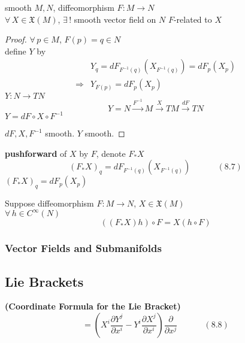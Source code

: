 \begin{proposition}[8.19]
  smooth $M,N$, diffeomorphism $F:M \to N$ \\
$\forall \, X \in \mathfrak{X}(M)$, $\exists \, !$ smooth vector field on $N$ $F$-related to $X$
\end{proposition}

\begin{proof}
$\forall \, p \in M$, $F(p) = q\in N$  \\

define $Y$ by 
\[
\begin{aligned}
  & Y_q = dF_{F^{-1}(q)}(X_{F^{-1}(q)} ) = dF_p(X_p) \\ 
  \Longrightarrow & Y_{F(p)} = dF_p(X_p) 
\end{aligned}
\]
$Y: N \to TN$ 
\[
Y = N \xrightarrow{F^{-1}} M \xrightarrow{X} TM \xrightarrow{dF} TN
\]
$Y = dF \circ X \circ F^{-1}$

$dF, X, F^{-1}$ smooth.  $Y$ smooth. 
\end{proof}
\textbf{pushforward} of $X$ by $F$, denote $F_*X$ 
\begin{equation}
  (F_*X)_q = dF_{F^{-1}(q)}(X_{F^{-1}(q) } ) \quad \quad \quad \, (8.7)
\end{equation}
$(F_*X)_q = dF_p(X_p)$



\begin{corollary}[8.21]
  Suppose diffeomorphism $F: M \to N$, $X \in \mathfrak{X}(M)$ \\
  $\forall \, h \in C^{\infty}(N)$
\[
((F_*X)h) \circ F = X(h\circ F)
\]
\end{corollary}


\subsubsection*{Vector Fields and Submanifolds}


\subsection*{Lie Brackets}

\begin{proposition}[8.26] \textbf{(Coordinate Formula for the Lie Bracket)}
  \begin{equation}
    [X,Y] = \left( X^i \frac{ \partial Y^j}{ \partial x^i } - Y^i \frac{ \partial X^j}{ \partial x^i } \right) \frac{\partial}{ \partial x^j }  \quad \quad \quad \, (8.8)
\end{equation}
\end{proposition}


